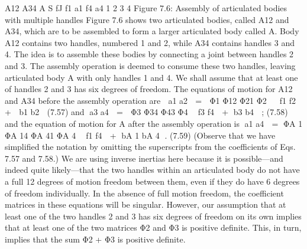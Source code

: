 A12 A34 A S fJ f1 a1 f4 a4 1 2 3 4 Figure 7.6: Assembly of articulated bodies with multiple handles Figure 7.6 shows two articulated bodies, called A12 and A34, which are to be assembled to form a larger articulated body called A. Body A12 contains two handles, numbered 1 and 2, while A34 contains handles 3 and 4. The idea is to assemble these bodies by connecting a joint between handles 2 and 3. The assembly operation is deemed to consume these two handles, leaving articulated body A with only handles 1 and 4. We shall assume that at least one of handles 2 and 3 has six degrees of freedom. The equations of motion for A12 and A34 before the assembly operation are  a1 a2  =  Φ1 Φ12 Φ21 Φ2   f1 f2  +  b1 b2  (7.57) and a3 a4  =  Φ3 Φ34 Φ43 Φ4  f3 f4  + b3 b4  ; (7.58) and the equation of motion for A after the assembly operation is a1 a4  = ΦA 1 ΦA 14 ΦA 41 ΦA 4  f1 f4  + bA 1 bA 4  . (7.59) (Observe that we have simplified the notation by omitting the superscripts from the coefficients of Eqs. 7.57 and 7.58.) We are using inverse inertias here because it is possible—and indeed quite likely—that the two handles within an articulated body do not have a full 12 degrees of motion freedom between them, even if they do have 6 degrees of freedom individually. In the absence of full motion freedom, the coefficient matrices in these equations will be singular. However, our assumption that at least one of the two handles 2 and 3 has six degrees of freedom on its own implies that at least one of the two matrices Φ2 and Φ3 is positive definite. This, in turn, implies that the sum Φ2 + Φ3 is positive definite.

